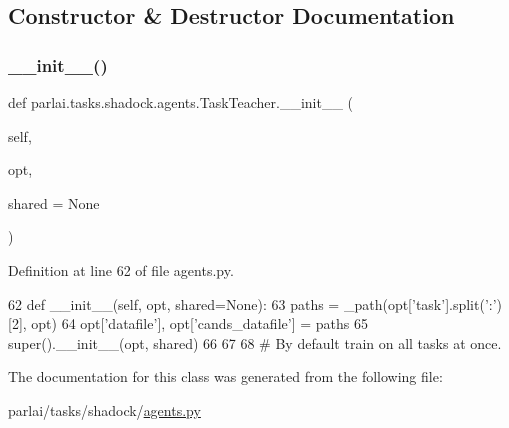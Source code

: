 \subsection{Constructor \& Destructor Documentation}
\mbox{\label{classparlai_1_1tasks_1_1shadock_1_1agents_1_1TaskTeacher_ae092a060ee469d5ffe511ad6bbed2fa9}} 
\subsubsection{\texorpdfstring{\+\_\+\+\_\+init\+\_\+\+\_\+()}{\_\_init\_\_()}}
{\footnotesize\ttfamily def parlai.\+tasks.\+shadock.\+agents.\+Task\+Teacher.\+\_\+\+\_\+init\+\_\+\+\_\+ (\begin{DoxyParamCaption}\item[{}]{self,  }\item[{}]{opt,  }\item[{}]{shared = {\ttfamily None} }\end{DoxyParamCaption})}



Definition at line 62 of file agents.\+py.


\begin{DoxyCode}
62     \textcolor{keyword}{def }\_\_init\_\_(self, opt, shared=None):
63         paths = \_path(opt[\textcolor{stringliteral}{'task'}].split(\textcolor{stringliteral}{':'})[2], opt)
64         opt[\textcolor{stringliteral}{'datafile'}], opt[\textcolor{stringliteral}{'cands\_datafile'}] = paths
65         super().\_\_init\_\_(opt, shared)
66 
67 
68 \textcolor{comment}{# By default train on all tasks at once.}
\end{DoxyCode}


The documentation for this class was generated from the following file\+:\begin{DoxyCompactItemize}
\item 
parlai/tasks/shadock/\hyperlink{parlai_2tasks_2shadock_2agents_8py}{agents.\+py}\end{DoxyCompactItemize}
